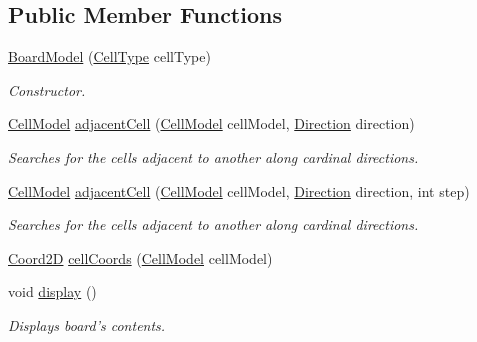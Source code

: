 \subsection*{Public Member Functions}
\begin{DoxyCompactItemize}
\item 
\hyperlink{classbattleship2D_1_1model_1_1BoardModel_ae4cfe2d64ce4aced2bd0ae0efd42764e}{Board\-Model} (\hyperlink{enumbattleship2D_1_1model_1_1CellType}{Cell\-Type} cell\-Type)
\begin{DoxyCompactList}\small\item\em Constructor. \end{DoxyCompactList}\item 
\hyperlink{classbattleship2D_1_1model_1_1CellModel}{Cell\-Model} \hyperlink{classbattleship2D_1_1model_1_1BoardModel_a301ebd2b0d375366c4c2549988c70522}{adjacent\-Cell} (\hyperlink{classbattleship2D_1_1model_1_1CellModel}{Cell\-Model} cell\-Model, \hyperlink{enumbattleship2D_1_1model_1_1Direction}{Direction} direction)
\begin{DoxyCompactList}\small\item\em Searches for the cells adjacent to another along cardinal directions. \end{DoxyCompactList}\item 
\hyperlink{classbattleship2D_1_1model_1_1CellModel}{Cell\-Model} \hyperlink{classbattleship2D_1_1model_1_1BoardModel_a5127bef6a246972c2cdacc38a07b36d8}{adjacent\-Cell} (\hyperlink{classbattleship2D_1_1model_1_1CellModel}{Cell\-Model} cell\-Model, \hyperlink{enumbattleship2D_1_1model_1_1Direction}{Direction} direction, int step)
\begin{DoxyCompactList}\small\item\em Searches for the cells adjacent to another along cardinal directions. \end{DoxyCompactList}\item 
\hyperlink{classbattleship2D_1_1model_1_1Coord2D}{Coord2\-D} \hyperlink{classbattleship2D_1_1model_1_1BoardModel_a9f192bbde7b6523a8ec7e78e09f08db1}{cell\-Coords} (\hyperlink{classbattleship2D_1_1model_1_1CellModel}{Cell\-Model} cell\-Model)
\item 
void \hyperlink{classbattleship2D_1_1model_1_1BoardModel_a70d5de35696401c7271e63e7392da0a0}{display} ()
\begin{DoxyCompactList}\small\item\em Displays board's contents. \end{DoxyCompactList}\item 

\end{DoxyCompactItemize}
